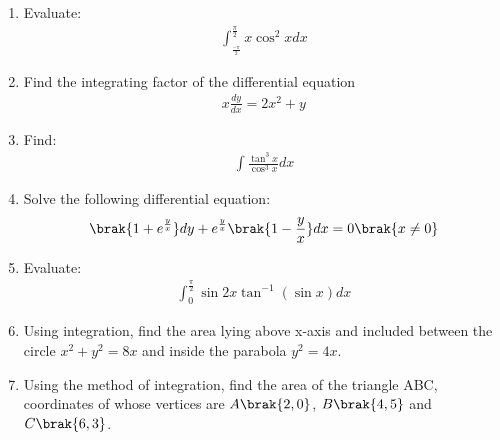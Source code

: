 \begin{enumerate}
\item Evaluate:
	\begin{align}
		\int^{\frac{\pi}{2}}_{_\frac{-\pi}{2}}x \cos^2x dx 
	\end{align}
		\item Find the integrating factor of the differential equation
\begin{align}
	x \frac{dy}{dx} = 2x^2 + y
\end{align}
\item Find:
\begin{align}
	\int \frac{\tan^3 x}{\cos^3 x} dx
\end{align}
\item Solve the following differential equation:
\begin{align}
	\brak{1+e^\frac{y}{x}}dy + e^\frac{y}{x}\brak{1-\frac{y}{x}} dx = 0 \brak{x \neq 0}
\end{align}
\item Evaluate:
\begin{align}
         \int^{\frac{\pi}{2}}_{0} \sin 2x \tan^{-1} (\sin x) dx
\end{align}
\item Using integration, find the area lying above x-axis and included between the circle $x^2 + y^2 = 8x$ and inside the parabola $y^2 = 4x$.
\item Using the method of integration, find the area of the triangle ABC, coordinates of whose vertices are $A\brak{2,0}$, $B\brak{4,5}$ and $C\brak{6,3}$.
\end{enumerate}
